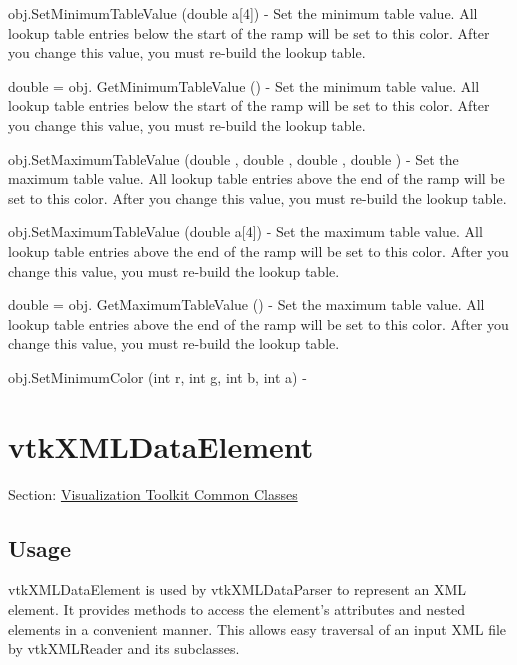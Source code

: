 \begin{DoxyItemize}
\item {\ttfamily obj.\-Set\-Minimum\-Table\-Value (double a\mbox{[}4\mbox{]})} -\/ Set the minimum table value. All lookup table entries below the start of the ramp will be set to this color. After you change this value, you must re-\/build the lookup table.  
\item {\ttfamily double = obj. Get\-Minimum\-Table\-Value ()} -\/ Set the minimum table value. All lookup table entries below the start of the ramp will be set to this color. After you change this value, you must re-\/build the lookup table.  
\item {\ttfamily obj.\-Set\-Maximum\-Table\-Value (double , double , double , double )} -\/ Set the maximum table value. All lookup table entries above the end of the ramp will be set to this color. After you change this value, you must re-\/build the lookup table.  
\item {\ttfamily obj.\-Set\-Maximum\-Table\-Value (double a\mbox{[}4\mbox{]})} -\/ Set the maximum table value. All lookup table entries above the end of the ramp will be set to this color. After you change this value, you must re-\/build the lookup table.  
\item {\ttfamily double = obj. Get\-Maximum\-Table\-Value ()} -\/ Set the maximum table value. All lookup table entries above the end of the ramp will be set to this color. After you change this value, you must re-\/build the lookup table.  
\item {\ttfamily obj.\-Set\-Minimum\-Color (int r, int g, int b, int a)} -\/  
\end{DoxyItemize}\hypertarget{vtkcommon_vtkxmldataelement}{}\section{vtk\-X\-M\-L\-Data\-Element}\label{vtkcommon_vtkxmldataelement}
Section\-: \hyperlink{sec_vtkcommon}{Visualization Toolkit Common Classes} \hypertarget{vtkwidgets_vtkxyplotwidget_Usage}{}\subsection{Usage}\label{vtkwidgets_vtkxyplotwidget_Usage}
vtk\-X\-M\-L\-Data\-Element is used by vtk\-X\-M\-L\-Data\-Parser to represent an X\-M\-L element. It provides methods to access the element's attributes and nested elements in a convenient manner. This allows easy traversal of an input X\-M\-L file by vtk\-X\-M\-L\-Reader and its subclasses.

